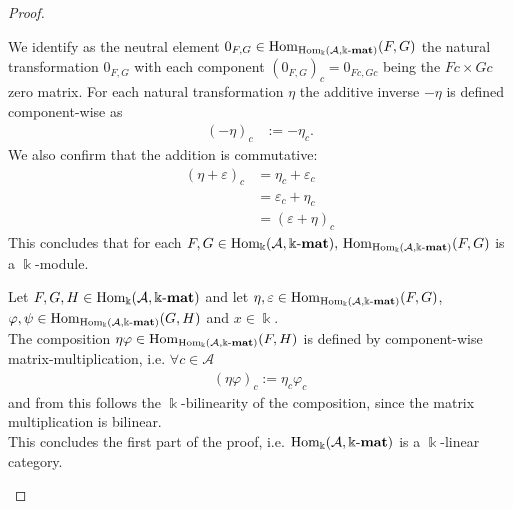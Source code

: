 \begin{proof}
\begin{enumerate}
\begin{subproof}[Proof of (i)]
We identify as the neutral element $0_{F,G} \in \mathrm{Hom}_{\mathrm{Hom_{\Bbbk}}(\mathcal{A},\Bbbk\textnormal{-}\mathbf{mat})}(F,G)$
the natural transformation $0_{F,G}$ with each component $(0_{F,G})_{c} = 0_{Fc,Gc}$ being the $Fc\times Gc$ zero matrix.
For each natural transformation $\eta$ the additive inverse $-\eta$ is defined component-wise as
\begin{align}
(-\eta)_{c} &:= -\eta_{c}.
\end{align}
We also confirm that the addition is commutative:
\begin{align}
(\eta+\varepsilon)_{c} &= \eta_{c} + \varepsilon_{c}\\
    &= \varepsilon_{c} + \eta_{c}\\
    &= (\varepsilon + \eta)_{c}
\end{align}
This concludes that for each $F, G \in \mathrm{Hom_{\Bbbk}}(\mathcal{A},\Bbbk\textnormal{-}\mathbf{mat}),\, \mathrm{Hom}_{\mathrm{Hom_{\Bbbk}}(\mathcal{A},\Bbbk\textnormal{-}\mathbf{mat})}(F,G)$ is a $\Bbbk$-module.
\end{subproof}
\begin{subproof}[Proof of (ii)]
Let $F, G, H \in \mathrm{Hom_{\Bbbk}}(\mathcal{A},\Bbbk\textnormal{-}\mathbf{mat})$ and let $\eta, \varepsilon \in \mathrm{Hom}_{\mathrm{Hom_{\Bbbk}}(\mathcal{A},\Bbbk\textnormal{-}\mathbf{mat})}(F,G)$,
$\varphi, \psi \in \mathrm{Hom}_{\mathrm{Hom_{\Bbbk}}(\mathcal{A},\Bbbk\textnormal{-}\mathbf{mat})}(G,H)$ and $x \in \Bbbk$.\\
The composition $\eta\varphi \in \mathrm{Hom}_{\mathrm{Hom_{\Bbbk}}(\mathcal{A},\Bbbk\textnormal{-}\mathbf{mat})}(F,H)$ is defined by component-wise matrix-multiplication,
i.e. $\forall c \in \mathcal{A}$
\begin{align*}
(\eta\varphi)_{c} := \eta_{c}\varphi_{c}
\end{align*}
and from this follows the $\Bbbk$-bilinearity of the composition, since the matrix multiplication is bilinear.\\
This concludes the first part of the proof, i.e. $\mathrm{Hom_{\Bbbk}}(\mathcal{A},\Bbbk\textnormal{-}\mathbf{mat})$ is a $\Bbbk$-linear category.
\end{subproof}


\end{enumerate}
\end{proof}
